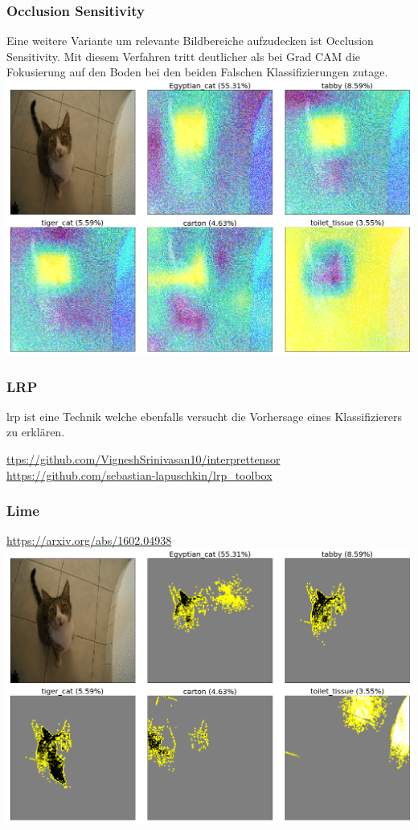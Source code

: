 \documentclass[
  12pt, %
  a4paper, %
  oneside, %
  openany, 
  numbers=noenddot, %
  BCOR=5mm, %
  parskip=half*, %
  thesis, %
]{bfhbook}
\begin{document}
\subsubsection*{Occlusion Sensitivity} \break
Eine weitere Variante um relevante Bildbereiche aufzudecken ist Occlusion Sensitivity. Mit diesem Verfahren tritt deutlicher als bei Grad CAM die Fokusierung auf den Boden bei den beiden Falschen Klassifizierungen zutage.
\includegraphics[width=\textwidth]{Bilder/OcclusionSensitivity-Classes.png}

\subsubsection*{LRP}
\acrfull{lrp} ist eine Technik welche ebenfalls versucht die Vorhersage eines Klassifizierers zu erklären. 

\url{ttps://github.com/VigneshSrinivasan10/interprettensor}
\url{https://github.com/sebastian-lapuschkin/lrp_toolbox}

\subsubsection*{Lime}
\url{https://arxiv.org/abs/1602.04938}
\includegraphics[width=\textwidth]{Bilder/Lime-Classes.png}
\end{document}
